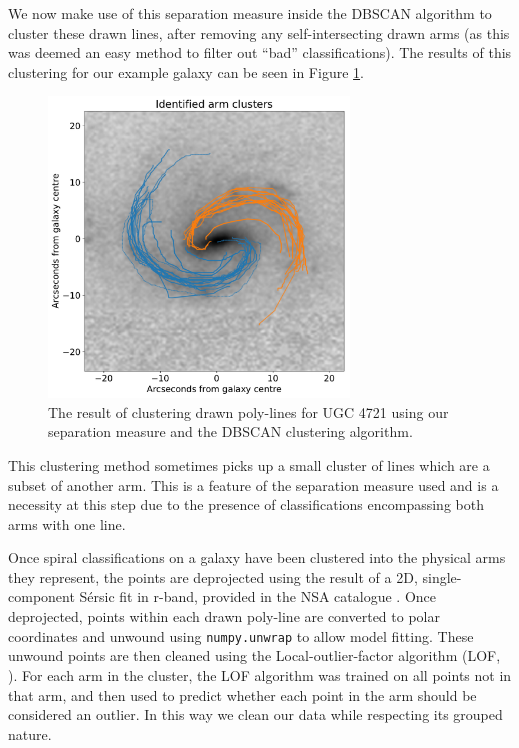 \documentclass[../main.tex]{subfiles}
\begin{document}
We now make use of this separation measure inside the DBSCAN algorithm to cluster these drawn lines, after removing any self-intersecting drawn arms (as this was deemed an easy method to filter out ``bad'' classifications). The results of this clustering for our example galaxy can be seen in Figure \ref{fig:arm_clusters}.

\begin{figure}
  \includegraphics[width=8cm]{images__method/arm_clusters.pdf}
  \caption{The result of clustering drawn poly-lines for UGC 4721 using our separation measure and the DBSCAN clustering algorithm.}
  \label{fig:arm_clusters}
\end{figure}

This clustering method sometimes picks up a small cluster of lines which are a subset of another arm. This is a feature of the separation measure used and is a necessity at this step due to the presence of classifications encompassing both arms with one line.

Once spiral classifications on a galaxy have been clustered into the physical arms they represent, the points are deprojected using the result of a 2D, single-component S\'ersic fit in r-band, provided in the NSA catalogue \citep{2011AJ....142...31B}. Once deprojected, points within each drawn poly-line are converted to polar coordinates and unwound using \texttt{numpy.unwrap} to allow model fitting. These unwound points are then cleaned using the Local-outlier-factor algorithm (LOF, \citealt{local-outlier-factor}). For each arm in the cluster, the LOF algorithm was trained on all points not in that arm, and then used to predict whether each point in the arm should be considered an outlier. In this way we clean our data while respecting its grouped nature.
\end{document}
